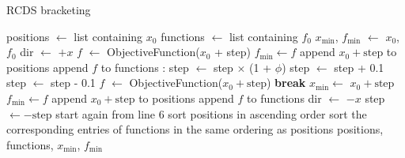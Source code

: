 \begin{algorithm}
    \caption{RCDS bracketing}\label{alg:brackets}
    \begin{algorithmic}[1]
        \State positions $\gets$ list containing $x_0$
        \State functions $\gets$ list containing $f_0$
        \State $x_{\text{min}}$, $f_{\text{min}}$ $\gets$ $x_0$, $f_0$
        \State dir $\gets$ $+x$
        \State $f$ $\gets$ ObjectiveFunction($x_0$ + step)
            \State $f_{\text{min}}\gets f$
        \EndIf
        \State append $x_0 + \text{step}$ to positions
        \State append $f$ to functions
        :
                \State step $\gets$ step $\times$ (1 + $\phi$)
                \State step $\gets$ step + 0.1
            \Else
                \State step $\gets$ step - 0.1
            \EndIf
            \State $f$ $\gets$ ObjectiveFunction($x_0 + \text{step}$)
                \State \textbf{break}
            \EndIf
                \State $x_{\text{min}} \gets$ $x_0 + \text{step}$
                \State $f_{\text{min}}\gets f$
            \EndIf
            \State append $x_0 + \text{step}$ to positions
            \State append $f$ to functions
        \EndWhile
            \State dir $\gets$ $-x$
            \State step $\gets - \text{step}$
            \State start again from line 6
        \EndIf
        \State sort positions in ascending order
        \State sort the corresponding entries of functions in the same ordering as positions
        \State \Return positions, functions, $x_{\text{min}}$, $f_{\text{min}}$
    \EndFunction
    \end{algorithmic}
    \end{algorithm}

